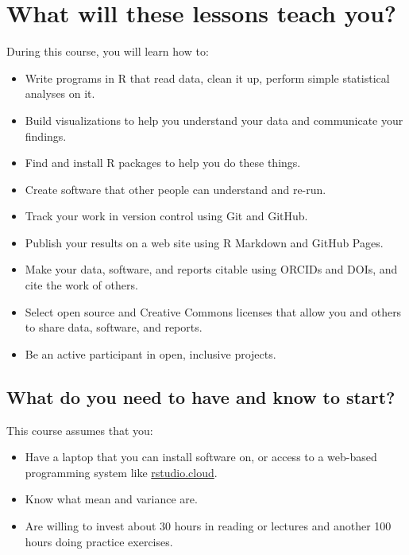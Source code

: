 \documentclass[]{Nemilov}
\providecommand{\tightlist}{%
  \setlength{\itemsep}{0pt}\setlength{\parskip}{0pt}}
\begin{document}
\hypertarget{r-intro-goals}{%
\section{What will these lessons teach you?}\label{r-intro-goals}}

During this course, you will learn how to:

\begin{itemize}
\tightlist
\item
  Write programs in R that read data, clean it up, perform simple statistical analyses on it.
\item
  Build visualizations to help you understand your data and communicate your findings.
\item
  Find and install R packages to help you do these things.
\item
  Create software that other people can understand and re-run.
\item
  Track your work in version control using Git and GitHub.
\item
  Publish your results on a web site using R Markdown and GitHub Pages.
\item
  Make your data, software, and reports citable using ORCIDs and DOIs, and cite the work of others.
\item
  Select open source and Creative Commons licenses that allow you and others to share data, software, and reports.
\item
  Be an active participant in open, inclusive projects.
\end{itemize}

\hypertarget{r-intro-prereq}{%
\subsection{What do you need to have and know to start?}\label{r-intro-prereq}}

This course assumes that you:

\begin{itemize}
\tightlist
\item
  Have a laptop that you can install software on, or access to a web-based programming system like \href{https://rstudio.cloud/}{rstudio.cloud}.
\item
  Know what mean and variance are.
\item
  Are willing to invest about 30 hours in reading or lectures and another 100 hours doing practice exercises.
\end{itemize}
\end{document}

